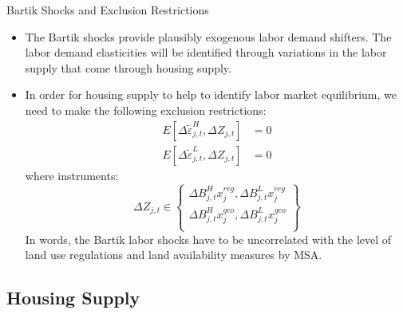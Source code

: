 \documentclass[aspectratio=169]{beamer}
\begin{document}
\begin{frame}{Bartik Shocks and Exclusion Restrictions}

\begin{itemize}
    \item<1->  The Bartik shocks provide plausibly exogenous labor demand shifters.  The labor demand elasticities will be identified through variations in the labor supply that come through housing supply.
    \item<2-> In order for housing supply to help to identify labor market equilibrium, we need to make the following exclusion restrictions:
    \begin{equation*}
        \begin{split}
            E\left[ \Delta \tilde{\varepsilon}_{j,t}^{H} , \Delta Z_{j,t} \right] &= 0 \\
            E\left[ \Delta \tilde{\varepsilon}_{j,t}^{L} , \Delta Z_{j,t} \right] &= 0
        \end{split}
    \end{equation*}
    where instruments:
    \begin{equation*}
        \Delta Z_{j,t} \in \left\{ \begin{matrix}
            \Delta B_{j,t}^{H} x_{j}^{reg} , \Delta B_{j,t}^{L} x_{j}^{reg} \\
            \Delta B_{j,t}^{H} x_{j}^{geo} , \Delta B_{j,t}^{L} x_{j}^{geo} \\
        \end{matrix} \right\}
    \end{equation*}
    In words, the Bartik labor shocks have to be uncorrelated with the level of land use regulations and land availability measures by MSA.
\end{itemize}
    
\end{frame}


\subsection{Housing Supply}

\end{document}

